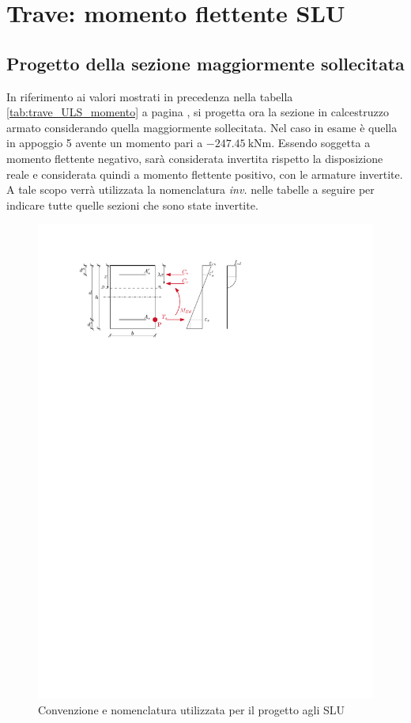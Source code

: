 \chapter{Trave: momento flettente SLU}
\section{Progetto della sezione maggiormente sollecitata}
In riferimento ai valori mostrati in precedenza nella tabella \ref{tab:trave_ULS_momento} a pagina \pageref{tab:trave_ULS_momento}, si progetta ora la sezione in calcestruzzo armato considerando quella maggiormente sollecitata.
Nel caso in esame è quella in appoggio 5 avente un momento pari a $\SI{-247.45}{\kilo\newton\metre}$.
Essendo soggetta a momento flettente negativo, sarà considerata invertita rispetto la disposizione reale e considerata quindi a momento flettente positivo, con le armature invertite. 
A tale scopo verrà utilizzata la nomenclatura \emph{inv.} nelle tabelle a seguire per indicare tutte quelle sezioni che sono state invertite.

\begin{figure}[ht]
  \centering
  \includegraphics[height=0.25\textheight]{IMG/IPE_slu_progetto.pdf}
  \caption{Convenzione e nomenclatura utilizzata per il progetto agli SLU}
  \label{fig:slu_progetto}
\end{figure}

